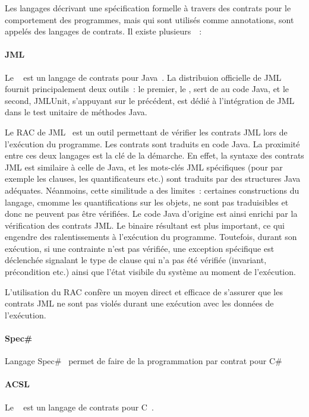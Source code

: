 Les langages décrivant une spécification formelle à travers des contrats pour
le comportement des programmes, mais qui sont utilisés comme annotations, sont
appelés des {\strong langages de contrats}. Il existe
plusieurs~~:

\paragraph{JML} Le ~ est un langage
de contrats pour Java~. La distribuion officielle de JML fournit
principalement deux outils~: le premier, le , sert de  au code Java, et le second, JMLUnit,
s'appuyant sur le précédent, est dédié à l'intégration de JML dans le test
unitaire de méthodes Java.

Le RAC de JML~ est un outil permettant de vérifier les contrats
JML lors de l'exécution du programme. Les contrats sont traduits en code Java.
La proximité entre ces deux langages est la clé de la démarche. En effet, la
syntaxe des contrats JML est similaire à celle de Java, et les mots-clés JML
spécifiques (pour par exemple les clauses, les quantificateurs etc.) sont
traduits par des structures Java adéquates.  Néanmoins, cette similitude a des
limites~: certaines constructions du langage, cmomme les quantifications sur les
objets, ne sont pas traduisibles et donc ne peuvent pas être vérifiées. Le code
Java d'origine est ainsi enrichi par la vérification des contrats JML. Le
binaire résultant est plus important, ce qui engendre des ralentissements à
l'exécution du programme. Toutefois, durant son exécution, si une contrainte
n'est pas vérifiée, une exception spécifique est déclenchée signalant le type de
clause qui n'a pas été vérifiée (invariant, précondition etc.) ainsi que l'état
visibile du système au moment de l'exécution.

L'utilisation du RAC confère un moyen direct et efficace de s'assurer que les
contrats JML ne sont pas violés durant une exécution avec les données de
l'exécution.

\paragraph{Spec\#} Langage Spec\#~ permet de faire de la
programmation par contrat pour C\#~

\paragraph{ACSL} Le ~ est
un langage de contrats pour C~.

